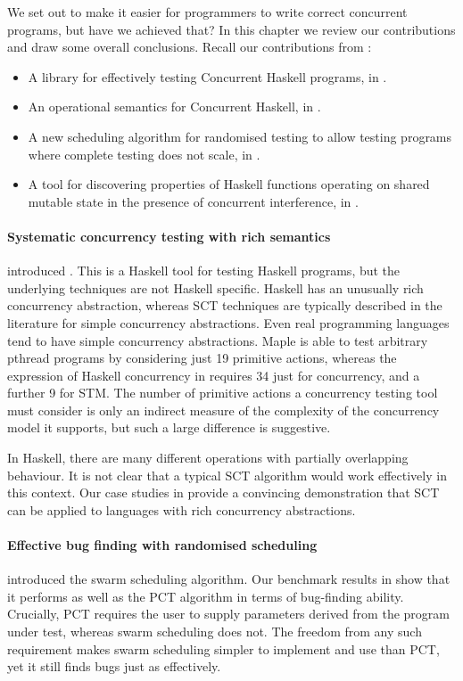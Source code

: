We set out to make it easier for programmers to write correct
concurrent programs, but have we achieved that?  In this chapter we
review our contributions and draw some overall conclusions.  Recall
our contributions from :

\begin{itemize}
\item A library for effectively testing Concurrent Haskell programs,
  in .
\item An operational semantics for Concurrent Haskell, in
  .
\item A new scheduling algorithm for randomised testing to allow
  testing programs where complete testing does not scale, in
  .
\item A tool for discovering properties of Haskell functions operating
  on shared mutable state in the presence of concurrent interference,
  in .
\end{itemize}

\paragraph{Systematic concurrency testing with rich semantics}
 introduced \dejafu{}.  This is a Haskell tool for
testing Haskell programs, but the underlying techniques are not
Haskell specific.  Haskell has an unusually rich concurrency
abstraction, whereas SCT techniques are typically described in the
literature for simple concurrency abstractions.  Even real programming
languages tend to have simple concurrency abstractions.
Maple\cite{yu2012} is able to test arbitrary pthread programs by
considering just 19 primitive actions, whereas the expression of
Haskell concurrency in \dejafu{} requires 34 just for concurrency, and
a further 9 for STM.  The number of primitive actions a concurrency
testing tool must consider is only an indirect measure of the
complexity of the concurrency model it supports, but such a large
difference is suggestive.

In Haskell, there are many different operations with partially
overlapping behaviour.  It is not clear that a typical SCT algorithm
would work effectively in this context.  Our case studies in
 provide a convincing demonstration that
SCT can be applied to languages with rich concurrency abstractions.

\paragraph{Effective bug finding with randomised scheduling}
 introduced the swarm scheduling algorithm.  Our
benchmark results in  show that it performs
as well as the PCT algorithm\cite{burckhardt2010} in terms of
bug-finding ability.  Crucially, PCT requires the user to supply
parameters derived from the program under test, whereas swarm
scheduling does not.  The freedom from any such requirement makes
swarm scheduling simpler to implement and use than PCT, yet it still
finds bugs just as effectively.

